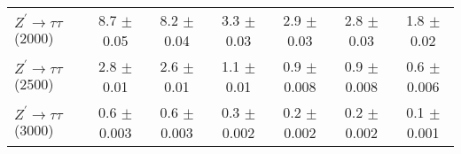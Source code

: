 \begin{table}[htbp!]
\begin{center}
{\begin{tabular}{| l | c | c | c | c | c | c |}
      $Z^\prime\to\tau\tau$(2000) & 8.7 $\pm$ 0.05 & 8.2 $\pm$ 0.04 & 3.3 $\pm$ 0.03 & 2.9 $\pm$ 0.03 & 2.8 $\pm$ 0.03 & 1.8 $\pm$ 0.02  \\
      $Z^\prime\to\tau\tau$(2500) & 2.8 $\pm$ 0.01 & 2.6 $\pm$ 0.01 & 1.1 $\pm$ 0.01 & 0.9 $\pm$ 0.008 & 0.9 $\pm$ 0.008 & 0.6 $\pm$ 0.006  \\
      $Z^\prime\to\tau\tau$(3000) & 0.6 $\pm$ 0.003 & 0.6 $\pm$ 0.003 & 0.3 $\pm$ 0.002 & 0.2 $\pm$ 0.002 & 0.2 $\pm$ 0.002 & 0.1 $\pm$ 0.001  \\
      \hline
    \end{tabular}
  }
  \label{tab:muTauCutFlowEff}
  \end{center}
\end{table}

